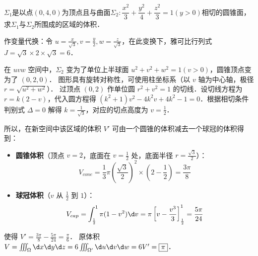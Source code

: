 \documentclass[12pt, a4paper, oneside, UTF8]{ctexbook}
\begin{document}
\begin{exercise}
    $\Sigma_1$是以点$(0,4,0)$为顶点且与曲面$\Sigma_2: \dfrac{x^2}{3}+\dfrac{y^2}{4}+\dfrac{z^2}{3}=1(y>0)$相切的圆锥面，求$\Sigma_1$与$\Sigma_2$所围成的区域的体积．
\end{exercise}
\begin{solution}
作变量代换：令 $u = \frac{x}{\sqrt{3}}, v = \frac{y}{2}, w = \frac{z}{\sqrt{3}}$，在此变换下，雅可比行列式 $J = \sqrt{3} \times 2 \times \sqrt{3} = 6$．

在 $uvw$ 空间中，$\Sigma_2$ 变为了单位上半球面 $u^2+v^2+w^2=1 (v>0)$，圆锥顶点变为了 $(0,2,0)$．
图形具有旋转对称性，可使用柱坐标系（以 $v$ 轴为中心轴，极径 $r = \sqrt{u^2+w^2}$）．
过顶点 $(0,2)$ 作单位圆 $r^2+v^2=1$ 的切线．设切线方程为 $r = k(2-v)$，代入圆方程得 $(k^2+1)v^2 - 4k^2v + 4k^2-1 = 0$．根据相切条件判别式 $\Delta=0$ 解得 $k = \frac{1}{\sqrt{3}}$，对应的切点高度为 $v = \frac{1}{2}$．

所以，在新空间中该区域的体积 $V'$ 可由一个圆锥的体积减去一个球冠的体积得到：
\begin{itemize}
    \item \textbf{圆锥体积}（顶点 $v=2$，底面在 $v=\frac{1}{2}$ 处，底面半径 $r=\frac{\sqrt{3}}{2}$）：
    \[ V_{cone} = \frac{1}{3}\pi \left(\frac{\sqrt{3}}{2}\right)^2 \times \left(2 - \frac{1}{2}\right) = \frac{3\pi}{8} \]
    \item \textbf{球冠体积}（$v$ 从 $\frac{1}{2}$ 到 $1$）：
    \[ V_{cap} = \int_{\frac{1}{2}}^1 \pi(1-v^2) \d v = \pi \left[ v - \frac{v^3}{3} \right]_{\frac{1}{2}}^1 = \frac{5\pi}{24} \]
\end{itemize}
使得 $V' = \frac{3\pi}{8} - \frac{5\pi}{24} = \frac{\pi}{6}$．
原体积 $V = \iiint_\Omega \d x\d y\d z = 6 \iiint_{\Omega'} \d u\d v\d w = 6 V' = \boxed{\pi}$．
\end{solution}
\end{document}
